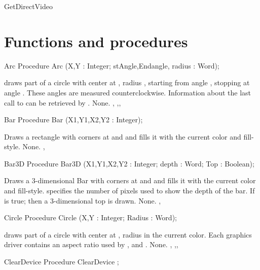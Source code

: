 \begin{function}{GetDirectVideo}
\section{Functions and procedures}


\begin{procedure}{Arc}
\Declaration
Procedure Arc (X,Y : Integer; stAngle,Endangle, radius : Word);

\Description
  draws part of a circle with center at , radius
, starting from angle , stopping at angle .
These  angles are measured counterclockwise. Information about the last call
to  can be retrieved by .
\Errors
None.
\SeeAlso
{},
,, 
\end{procedure}

\begin{procedure}{Bar}
\Declaration
Procedure Bar (X1,Y1,X2,Y2 : Integer);

\Description
Draws a rectangle with corners at  and 
and fills it with the current color and fill-style.
\Errors
None.
\SeeAlso
{},
\end{procedure}

\begin{procedure}{Bar3D}
\Declaration
Procedure Bar3D (X1,Y1,X2,Y2 : Integer; depth : Word; Top : Boolean);

\Description
Draws a 3-dimensional Bar  with corners at  and 
and fills it with the current color and fill-style.
 specifies the number of pixels used to show the depth of the
bar.
If  is true; then a 3-dimensional top is drawn.
\Errors
None.
\SeeAlso
{}, 
\end{procedure}

\begin{procedure}{Circle}
\Declaration
Procedure Circle (X,Y : Integer; Radius : Word);

\Description
  draws part of a circle with center at , radius
 in the current color. Each graphics driver contains an
aspect ratio used by ,  and .
\Errors
None.
\SeeAlso
{},
,, 
\end{procedure}

\begin{procedure}{ClearDevice}
\Declaration
Procedure ClearDevice ;


\end{procedure}
\end{function}
